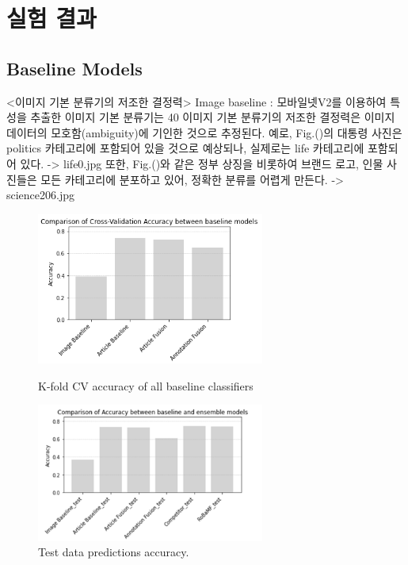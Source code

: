 \documentclass{article}
\begin{document}
\section{실험 결과}
\subsection{Baseline Models}
<이미지 기본 분류기의 저조한 결정력>
Image baseline : 모바일넷V2를 이용하여 특성을 추출한 이미지 기본 분류기는 40%
이미지 기본 분류기의 저조한 결정력은 이미지 데이터의 모호함(ambiguity)에 기인한 것으로 추정된다.
예로, Fig.()의 대통령 사진은 politics 카테고리에 포함되어 있을 것으로 예상되나, 실제로는 life 카테고리에 포함되어 있다. -> life0.jpg 
또한, Fig.()와 같은 정부 상징을 비롯하여 브랜드 로고, 인물 사진들은 모든 카테고리에 분포하고 있어, 정확한 분류를 어렵게 만든다. -> science206.jpg

\begin{figure}[ht]
    \centering
    \begin{minipage}{0.48\textwidth}
        \centering
        \includegraphics[width=7.5cm]{ENG/fig. 2.png} %
        \caption{K-fold CV accuracy of all baseline classifiers}
        \label{fig.5}
    \end{minipage}\hfill
    \begin{minipage}{0.48\textwidth}
        \centering
        \includegraphics[width=7.5cm]{ENG/test-data-preds.png} %
        \caption{Test data predictions accuracy.}
        \label{fig.6}
    \end{minipage}
\end{figure}
\end{document}
